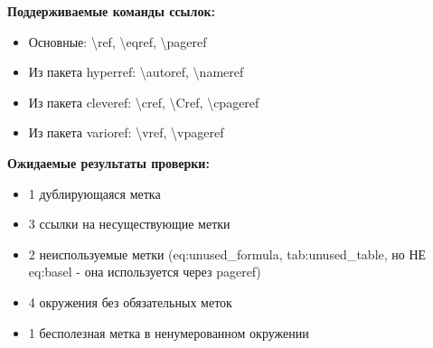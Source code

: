 \documentclass{article}
\begin{document}
\textbf{Поддерживаемые команды ссылок:}
\begin{itemize}
    \item Основные: \textbackslash ref, \textbackslash eqref, \textbackslash pageref
    \item Из пакета hyperref: \textbackslash autoref, \textbackslash nameref
    \item Из пакета cleveref: \textbackslash cref, \textbackslash Cref, \textbackslash cpageref
    \item Из пакета varioref: \textbackslash vref, \textbackslash vpageref
\end{itemize}

\textbf{Ожидаемые результаты проверки:}
\begin{itemize}
    \item 1 дублирующаяся метка 
    \item 3 ссылки на несуществующие метки
    \item 2 неиспользуемые метки (eq:unused_formula, tab:unused_table, но НЕ eq:basel - она используется через pageref)
    \item 4 окружения без обязательных меток
    \item 1 бесполезная метка в ненумерованном окружении
\end{itemize}
\end{document}
